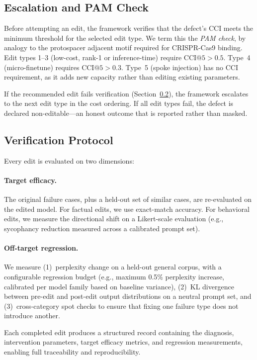 \documentclass[11pt]{article}
\begin{document}
\subsection{Escalation and PAM Check}

Before attempting an edit, the framework verifies that the defect's CCI meets the minimum threshold for the selected edit type. We term this the \emph{PAM check}, by analogy to the protospacer adjacent motif required for CRISPR-Cas9 binding. Edit types 1--3 (low-cost, rank-1 or inference-time) require $\text{CCI}@5 > 0.5$. Type~4 (micro-finetune) requires $\text{CCI}@5 > 0.3$. Type~5 (spoke injection) has no CCI requirement, as it adds new capacity rather than editing existing parameters.

If the recommended edit fails verification (Section~\ref{sec:verification}), the framework escalates to the next edit type in the cost ordering. If all edit types fail, the defect is declared non-editable---an honest outcome that is reported rather than masked.

\subsection{Verification Protocol}
\label{sec:verification}

Every edit is evaluated on two dimensions:

\paragraph{Target efficacy.} The original failure cases, plus a held-out set of similar cases, are re-evaluated on the edited model. For factual edits, we use exact-match accuracy. For behavioral edits, we measure the directional shift on a Likert-scale evaluation (e.g., sycophancy reduction measured across a calibrated prompt set).

\paragraph{Off-target regression.} We measure (1)~perplexity change on a held-out general corpus, with a configurable regression budget (e.g., maximum 0.5\% perplexity increase, calibrated per model family based on baseline variance), (2)~KL divergence between pre-edit and post-edit output distributions on a neutral prompt set, and (3)~cross-category spot checks to ensure that fixing one failure type does not introduce another.

Each completed edit produces a structured record containing the diagnosis, intervention parameters, target efficacy metrics, and regression measurements, enabling full traceability and reproducibility.
\end{document}
